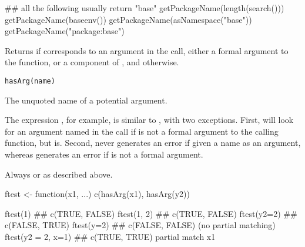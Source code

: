 %
\begin{SeeAlso}\relax
\end{SeeAlso}
%
\begin{Examples}
\begin{ExampleCode}
## all the following usually return "base"
getPackageName(length(search()))
getPackageName(baseenv())
getPackageName(asNamespace("base"))
getPackageName("package:base")

\end{ExampleCode}
\end{Examples}
%
\begin{Description}\relax
Returns  if  corresponds to an argument in the
call, either a formal argument to the function, or a component of
, and  otherwise.
\end{Description}
%
\begin{Usage}
\begin{verbatim}
hasArg(name)
\end{verbatim}
\end{Usage}
%
\begin{Arguments}
\begin{ldescription}
\item[\code{name}] The unquoted name of a potential argument.
\end{ldescription}
\end{Arguments}
%
\begin{Details}\relax
The expression , for example, is similar to
, with two exceptions.  First,   will look for
an argument named  in the call if  is not a formal
argument to the calling function, but  is.  Second,
 never generates an error if given a name as an argument,
whereas  generates an error if  is not a
formal argument.
\end{Details}
%
\begin{Value}
Always  or  as described above.
\end{Value}
%
\begin{SeeAlso}\relax
\end{SeeAlso}
%
\begin{Examples}
\begin{ExampleCode}
ftest <- function(x1, ...) c(hasArg(x1), hasArg(y2))

ftest(1) ## c(TRUE, FALSE)
ftest(1, 2)  ## c(TRUE, FALSE)
ftest(y2=2)   ## c(FALSE, TRUE)
ftest(y=2)    ## c(FALSE, FALSE) (no partial matching)
ftest(y2 = 2, x=1)  ## c(TRUE, TRUE) partial match x1


\end{ExampleCode}
\end{Examples}
